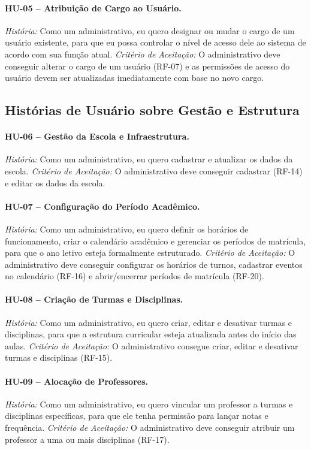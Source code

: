 \paragraph{HU-05 -- Atribuição de Cargo ao Usuário.}
\textit{História:} Como um administrativo, eu quero designar ou mudar o
cargo de um usuário existente, para que eu possa controlar o nível de
acesso dele ao sistema de acordo com sua função atual.
\textit{Critério de Aceitação:} O administrativo deve conseguir alterar o
cargo de um usuário (RF-07) e as permissões de acesso do usuário devem ser
atualizadas imediatamente com base no novo cargo.

\subsection{Histórias de Usuário sobre Gestão e Estrutura}

\paragraph{HU-06 -- Gestão da Escola e Infraestrutura.}
\textit{História:} Como um administrativo, eu quero cadastrar e atualizar
os dados da escola.
\textit{Critério de Aceitação:} O administrativo deve conseguir cadastrar
(RF-14) e editar os dados da escola.

\paragraph{HU-07 -- Configuração do Período Acadêmico.}
\textit{História:} Como um administrativo, eu quero definir os horários de
funcionamento, criar o calendário acadêmico e gerenciar os períodos de
matrícula, para que o ano letivo esteja formalmente estruturado.
\textit{Critério de Aceitação:} O administrativo deve conseguir configurar
os horários de turnos, cadastrar eventos no calendário (RF-16) e
abrir/encerrar períodos de matrícula (RF-20).

\paragraph{HU-08 -- Criação de Turmas e Disciplinas.}
\textit{História:} Como um administrativo, eu quero criar, editar e
desativar turmas e disciplinas, para que a estrutura curricular esteja
atualizada antes do início das aulas.
\textit{Critério de Aceitação:} O administrativo consegue criar, editar e
desativar turmas e disciplinas (RF-15).

\paragraph{HU-09 -- Alocação de Professores.}
\textit{História:} Como um administrativo, eu quero vincular um professor a
turmas e disciplinas específicas, para que ele tenha permissão para
lançar notas e frequência.
\textit{Critério de Aceitação:} O administrativo deve conseguir atribuir um
professor a uma ou mais disciplinas (RF-17).

